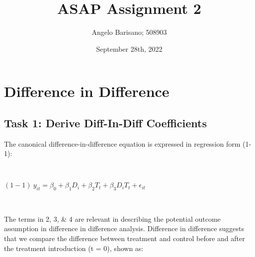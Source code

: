 \documentclass[a4paper]{article}
\begin{document}
\title{ASAP Assignment 2}
\author{Angelo Barisano; 508903 }
\date{September 28th, 2022}
\maketitle

\newpage
\section{Difference in Difference}






\subsection{Task 1: Derive Diff-In-Diff Coefficients}
The canonical difference-in-difference equation is expressed in regression form (1-1): 

\

$(1-1) \ {y_{it}} = \beta_{0} + \beta_{1} D_i + \beta_{2} T_t+ \beta_{3} D_i T_t + \epsilon_{it}$

\

%


The terms in 2, 3, \& 4 are relevant in describing the potential outcome assumption in difference in difference analysis. Difference in difference suggests that we compare the difference between treatment and control before and after the treatment introduction (t = 0), shown as:
\end{document}
